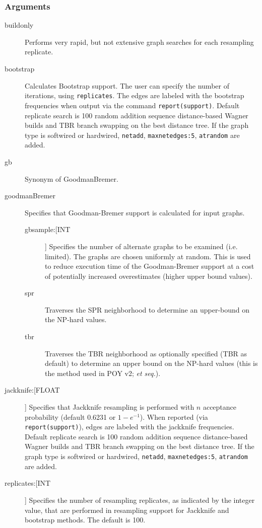 	\subsubsection{Arguments}
		\begin{description}
		\item[buildonly] Performs very rapid, but not extensive graph searches for each 
		resampling replicate.
		
		\item[bootstrap] Calculates Bootstrap support. The user can specify the number of 
		iterations, using \texttt{replicates}. The edges are labeled with the bootstrap 
		frequencies when output via the command \texttt{report(support)}. Default replicate search is 100 random addition 
		sequence distance-based Wagner builds and TBR branch swapping on the best distance tree.
		If the graph type is softwired or hardwired, \texttt{netadd}, \texttt{maxnetedges:5}, \texttt{atrandom} are 
		added. 
		
		\item[gb] Synonym of GoodmanBremer.
			
		\item[goodmanBremer] Specifies that Goodman-Bremer support is 
		calculated for input graphs. 
			
			\begin{description}
			\item[gbsample:[INT]] Specifies the number of alternate graphs to be examined (i.e. limited). 
			The graphs are chosen uniformly at random.  This is used to reduce execution time of the Goodman-Bremer
			support at a cost of potentially increased overestimates (higher upper bound values). 
			
			\item[spr] Traverses the SPR neighborhood to determine an upper-bound on 
			the NP-hard values.
			
			\item[tbr] Traverses the TBR neighborhood 
			as optionally specified (TBR as default) to determine an upper bound on the NP-hard 
			values (this is the method used in POY v2; \citealp{POY2} \textit{et seq.}).
			\end{description}
		
		\item[jackknife:[FLOAT]] Specifies that Jackknife resampling is performed with $n$ acceptance 
		probability (default 0.6231 or $1 - e^{-1}$). When reported (via \texttt{report(support)}), 
		edges are labeled with the jackknife frequencies. Default replicate search is 100 random addition 
		sequence distance-based Wagner builds and TBR branch swapping on the best distance tree.  
		If the graph type is softwired or hardwired, \texttt{netadd}, \texttt{maxnetedges:5}, \texttt{atrandom} are 
		added. 
		
		\item[replicates:[INT]] Specifies the number of resampling replicates, as indicated by the 
		integer value, that are performed in resampling support for Jackknife and bootstrap methods. 
		The default is 100.
		\end{description}	
		
